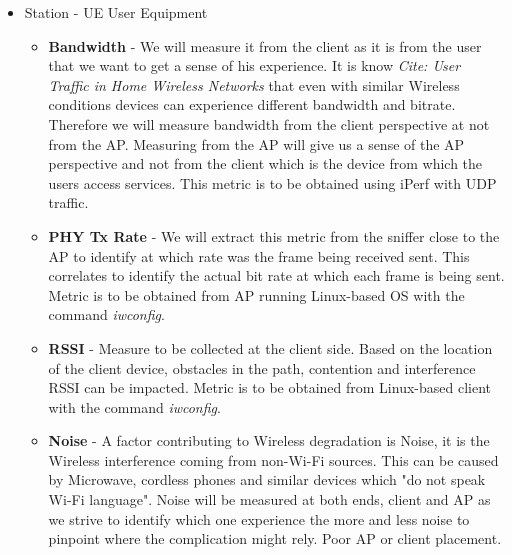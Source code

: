 \begin{itemize}
	\item Station - UE User Equipment 
	\begin{itemize}
		\item \textbf{Bandwidth} - We will measure it from the client as it is from the user that we want to get a sense of his experience. It is know \emph{Cite: User Traffic in Home Wireless Networks} that even with similar Wireless conditions devices can experience different bandwidth and bitrate. Therefore we will measure bandwidth from the client perspective at not from the AP. Measuring from the AP will give us a sense of the AP perspective and not from the client which is the device from which the users access services. This metric is to be obtained using iPerf with UDP traffic.
		\item \textbf{PHY Tx Rate} - We will extract this metric from the sniffer close to the AP to identify at which rate was the frame being received sent. This correlates to identify the actual bit rate at which each frame is being sent. Metric is to be obtained from AP running Linux-based OS with the command \emph{iwconfig}.
		\item \textbf{RSSI} - Measure to be collected at the client side. Based on the location of the client device, obstacles in the path, contention and interference RSSI can be impacted. Metric is to be obtained from Linux-based client with the command \emph{iwconfig}.
		\item \textbf{Noise} - A factor contributing to Wireless degradation is Noise, it is the Wireless interference coming from non-Wi-Fi sources. This can be caused by Microwave, cordless phones and similar devices which "do not speak Wi-Fi language". Noise will be measured at both ends, client and AP as we strive to identify which one experience the more and less noise to pinpoint where the complication might rely. Poor AP or client placement.
		
	\end{itemize}
	

\end{itemize}
